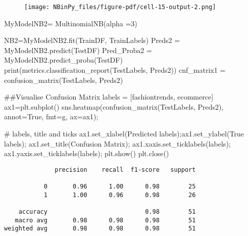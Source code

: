 \documentclass[
  letterpaper,
  DIV=11,
  numbers=noendperiod]{scrartcl}
\newenvironment{Shaded}{\begin{snugshade}}{\end{snugshade}}
\newcommand{\BuiltInTok}[1]{\textcolor[rgb]{0.00,0.23,0.31}{#1}}
\newcommand{\CommentTok}[1]{\textcolor[rgb]{0.37,0.37,0.37}{#1}}
\newcommand{\DecValTok}[1]{\textcolor[rgb]{0.68,0.00,0.00}{#1}}
\newcommand{\NormalTok}[1]{\textcolor[rgb]{0.00,0.23,0.31}{#1}}
\newcommand{\OperatorTok}[1]{\textcolor[rgb]{0.37,0.37,0.37}{#1}}
\newcommand{\StringTok}[1]{\textcolor[rgb]{0.13,0.47,0.30}{#1}}
\newcommand{\VariableTok}[1]{\textcolor[rgb]{0.07,0.07,0.07}{#1}}
\begin{document}
\begin{figure}[H]

{\centering \texttt{[image: NBinPy\_files/figure-pdf/cell-15-output-2.png]}

}

\end{figure}

\begin{Shaded}
\begin{Highlighting}[]
\NormalTok{MyModelNB2}\OperatorTok{=}\NormalTok{ MultinomialNB(alpha }\OperatorTok{=}\DecValTok{3}\NormalTok{)}

\NormalTok{NB2}\OperatorTok{=}\NormalTok{MyModelNB2.fit(TrainDF, TrainLabels)}
\NormalTok{Preds2 }\OperatorTok{=}\NormalTok{ MyModelNB2.predict(TestDF)}
\NormalTok{Pred\_Proba2 }\OperatorTok{=}\NormalTok{ MyModelNB2.predict\_proba(TestDF)}
\BuiltInTok{print}\NormalTok{(metrics.classification\_report(TestLabels, Preds2))}
\NormalTok{cnf\_matrix1 }\OperatorTok{=}\NormalTok{ confusion\_matrix(TestLabels, Preds2)}

\CommentTok{\#\#Visualise Confusion Matrix}
\NormalTok{labels }\OperatorTok{=}\NormalTok{ [}\StringTok{\textquotesingle{}fashiontrends\textquotesingle{}}\NormalTok{, }\StringTok{\textquotesingle{}ecommerce\textquotesingle{}}\NormalTok{]}
\NormalTok{ax1}\OperatorTok{=}\NormalTok{plt.subplot()}
\NormalTok{sns.heatmap(confusion\_matrix(TestLabels, Preds2), annot}\OperatorTok{=}\VariableTok{True}\NormalTok{, fmt}\OperatorTok{=}\StringTok{\textquotesingle{}g\textquotesingle{}}\NormalTok{, ax}\OperatorTok{=}\NormalTok{ax1)}\OperatorTok{;}

\CommentTok{\# labels, title and ticks}
\NormalTok{ax1.set\_xlabel(}\StringTok{\textquotesingle{}Predicted labels\textquotesingle{}}\NormalTok{)}\OperatorTok{;}\NormalTok{ax1.set\_ylabel(}\StringTok{\textquotesingle{}True labels\textquotesingle{}}\NormalTok{)}\OperatorTok{;} 
\NormalTok{ax1.set\_title(}\StringTok{\textquotesingle{}Confusion Matrix\textquotesingle{}}\NormalTok{)}\OperatorTok{;} 
\NormalTok{ax1.xaxis.set\_ticklabels(labels)}\OperatorTok{;}\NormalTok{ ax1.yaxis.set\_ticklabels(labels)}\OperatorTok{;}
\NormalTok{plt.show()}
\NormalTok{plt.close()}
\end{Highlighting}
\end{Shaded}

\begin{verbatim}
              precision    recall  f1-score   support

           0       0.96      1.00      0.98        25
           1       1.00      0.96      0.98        26

    accuracy                           0.98        51
   macro avg       0.98      0.98      0.98        51
weighted avg       0.98      0.98      0.98        51
\end{verbatim}
\end{document}
